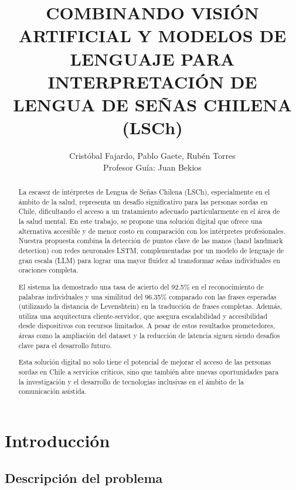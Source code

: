 \documentclass{article}
\begin{document}
\title{COMBINANDO VISIÓN ARTIFICIAL Y MODELOS DE LENGUAJE PARA INTERPRETACIÓN DE LENGUA DE SEÑAS CHILENA (LSCh)}

\author{Cristóbal Fajardo, Pablo Gaete, Rubén Torres \\ 
Profesor Guía: Juan Bekios}


\maketitle


\begin{abstract}

La escasez de intérpretes de Lengua de Señas Chilena (LSCh), especialmente en el ámbito de la salud, representa un desafío significativo para las personas sordas en Chile, dificultando el acceso a un tratamiento adecuado particularmente en el área de la salud mental. En este trabajo, se propone una solución digital que ofrece una alternativa accesible y de menor costo en comparación con los intérpretes profesionales. Nuestra propuesta combina la detección de puntos clave de las manos (hand landmark detection) con redes neuronales LSTM, complementadas por un modelo de lenguaje de gran escala (LLM) para lograr una mayor fluidez al transformar señas individuales en oraciones completa.

El sistema ha demostrado una tasa de acierto del 92.5\% en el reconocimiento de palabras individuales y una similitud del 96.35\% comparado con las frases esperadas (utilizando la distancia de Levenshtein) en la traducción de frases completas. Además, utiliza una arquitectura cliente-servidor, que asegura escalabilidad y accesibilidad desde dispositivos con recursos limitados. A pesar de estos resultados prometedores, áreas como la ampliación del dataset y la reducción de latencia siguen siendo desafíos clave para el desarrollo futuro.

Esta solución digital no solo tiene el potencial de mejorar el acceso de las personas sordas en Chile a servicios críticos, sino que también abre nuevas oportunidades para la investigación y el desarrollo de tecnologías inclusivas en el ámbito de la comunicación asistida.

\end{abstract}

\section{Introducción}

\subsection{Descripción del problema}
\end{document}
